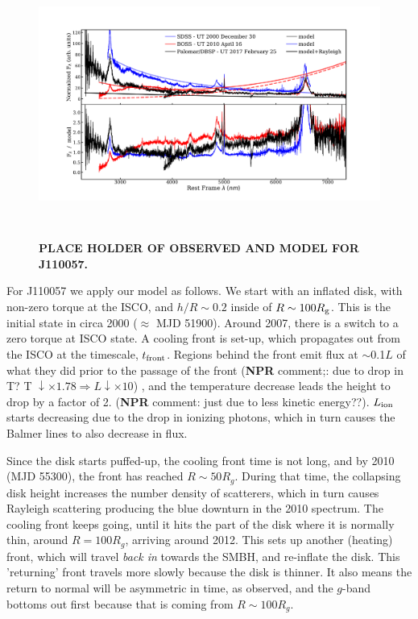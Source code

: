 \documentclass{nature}
\begin{document}
\begin{figure}
  \includegraphics[width=15.4cm, height=8.75cm, trim=0.0cm 0.0cm 0.0cm 0.0cm, clip]
  {../plots/models/mcd_gap_v3_20171016v1.pdf}
  \centering
  \caption[]{
{\bf PLACE HOLDER OF OBSERVED AND MODEL FOR J110057. }
}
  \label{fig:J110057_diskmodel}
\end{figure}

For J110057 we apply our model as follows. We start with an inflated
disk, with non-zero torque at the ISCO, and $h/R\sim0.2$ inside of
$R\sim100 R_{\rm g}$.  This is the initial state in circa 2000
($\approx$ MJD 51900).  Around 2007, there is a switch to a zero torque
at ISCO state.  A cooling front is set-up, which propagates out from
the ISCO at the timescale, $t_{\rm front}$. Regions behind the front
emit flux at $\sim$0.1$L$ of what they did prior to the passage of the
front ({\bf NPR} comment;: due to drop in T?  T $\downarrow \times
1.78 \Rightarrow L \downarrow \times10$) , and the temperature
decrease leads the height to drop by a factor of 2.  ({\bf NPR}
comment: just due to less kinetic energy??).  $L_{\rm ion}$ starts
decreasing due to the drop in ionizing photons, which in turn causes
the Balmer lines to also decrease in flux.

Since the disk starts puffed-up, the cooling front time is not long,
and by 2010 (MJD 55300), the front has reached $R\sim50 R_{g}$. During
that time, the collapsing disk height increases the number density of
scatterers, which in turn causes Rayleigh scattering producing the
blue downturn in the 2010 spectrum.  The cooling front keeps going,
until it hits the part of the disk where it is normally thin, around
$R=100 R_g$, arriving around 2012. This sets up another (heating)
front, which will travel {\it back in} towards the SMBH, and
re-inflate the disk. This 'returning' front travels more slowly
because the disk is thinner. It also means the return to normal will
be asymmetric in time, as observed, and the $g$-band bottoms out first
because that is coming from $R\sim100R_{g}$.
\end{document}
